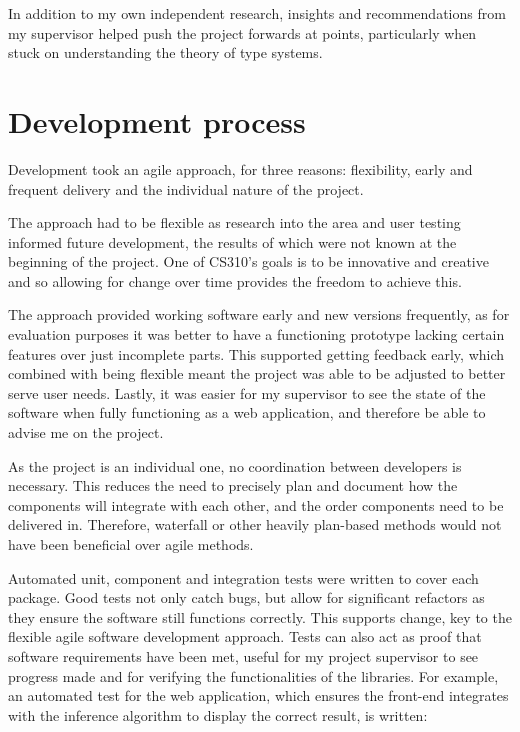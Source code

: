 \documentclass[a4paper,fleqn,oneside,12pt]{report}
\begin{document}
In addition to my own independent research, insights and recommendations from my supervisor helped push the project forwards at points, particularly when stuck on understanding the theory of type systems.

\section{Development process}\label{id:h.3r2hzi490wg9}

Development took an agile approach, for three reasons: flexibility, early and frequent delivery and the individual nature of the project.

The approach had to be flexible as research into the area and user testing informed future development, the results of which were not known at the beginning of the project. One of CS310's goals is to be innovative and creative and so allowing for change over time provides the freedom to achieve this.

The approach provided working software early and new versions frequently, as for evaluation purposes it was better to have a functioning prototype lacking certain features over just incomplete parts. This supported getting feedback early, which combined with being flexible meant the project was able to be adjusted to better serve user needs. Lastly, it was easier for my supervisor to see the state of the software when fully functioning as a web application, and therefore be able to advise me on the project.

As the project is an individual one, no coordination between developers is necessary. This reduces the need to precisely plan and document how the components will integrate with each other, and the order components need to be delivered in. Therefore, waterfall or other heavily plan-based methods would not have been beneficial over agile methods.

Automated unit, component and integration tests were written to cover each package. Good tests not only catch bugs, but allow for significant refactors as they ensure the software still functions correctly. This supports change, key to the flexible agile software development approach. Tests can also act as proof that software requirements have been met, useful for my project supervisor to see progress made and for verifying the functionalities of the libraries. For example, an automated test for the web application, which ensures the front-end integrates with the inference algorithm to display the correct result, is written:
\end{document}
